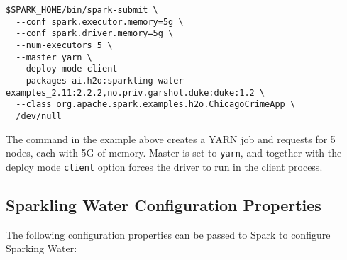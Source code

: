 \begin{lstlisting}[style=Bash]
$SPARK_HOME/bin/spark-submit \ 
  --conf spark.executor.memory=5g \
  --conf spark.driver.memory=5g \
  --num-executors 5 \
  --master yarn \
  --deploy-mode client
  --packages ai.h2o:sparkling-water-examples_2.11:2.2.2,no.priv.garshol.duke:duke:1.2 \
  --class org.apache.spark.examples.h2o.ChicagoCrimeApp \
  /dev/null
\end{lstlisting}

The command in the example above creates a YARN job and requests for 5 nodes, each with 5G of memory. Master is set to \texttt{yarn}, and together with the deploy mode \texttt{client} option forces the driver to run in the client process.

\newpage

\subsection{Sparkling Water Configuration Properties}
\label{sec:properties}
The following configuration properties can be passed to Spark to configure Sparking Water:

